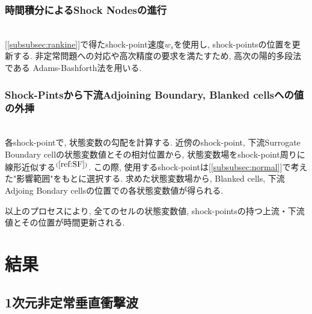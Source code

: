 \documentclass[a4j]{jarticle}
\begin{document}
\subsubsection{時間積分によるShock Nodesの進行} \label{subsubsec:prop}
\mbox{}\\[-1.0ex]

[\ref{subsubsec:rankine}]で得たshock-point速度$w_s$を使用し, shock-pointsの位置を更新する.
非定常問題への対応や高次精度の要求を満たすため, 高次の陽的多段法である
Adams-Bashforth法を用いる.

\subsubsection{Shock-Pintsから下流Adjoining Boundary, Blanked cellsへの値の外挿} \label{subsubsec:adjoining}
\mbox{}\\[-1.0ex]

各shock-pointで, 状態変数の勾配を計算する.
近傍のshock-point, 下流Surrogate Boundary cellの状態変数値とその相対位置から, 
状態変数場をshock-point周りに線形近似する$^{(\ref{ref:SF})}$.
この際, 使用するshock-pointは[\ref{subsubsec:normal}]で考えた"影響範囲"をもとに選択する.
求めた状態変数場から, Blanked cells, 下流Adjoing Bondary cellsの位置での各状態変数値が得られる.

以上のプロセスにより, 全てのセルの状態変数値, shock-pointsの持つ上流・下流値とその位置が時間更新される.

\section{結果}
\subsection{1次元非定常垂直衝撃波}\label{subsec:1D}
\mbox{}\\[-3.0ex]
\end{document}
